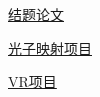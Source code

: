\documentclass[UTF8]{ctexart}
\begin{document}
    \href{https://github.com/LRLVEC/FinalPaper/blob/master/%E9%9D%A2%E5%90%91VR%E5%A4%B4%E7%9B%94%E7%9A%84%E5%AE%9E%E6%97%B6%E7%9C%9F%E5%AE%9E%E6%84%9F%E7%BB%98%E5%88%B6%E7%B3%BB%E7%BB%9F.pdf}{结题论文}

    \href{https://github.com/LRLVEC/PhotonMapping}{光子映射项目}
    
    \href{https://github.com/LRLVEC/RTRTGIVR}{VR项目}
\end{document}
